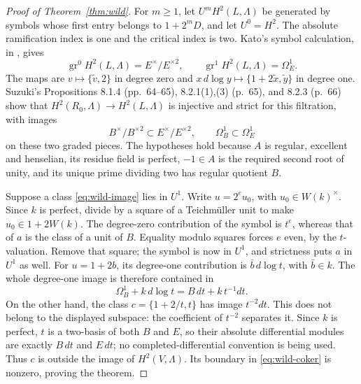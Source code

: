 \begin{proof}[Proof of Theorem~\ref{thm:wild}]
For $m\ge1$, let $U^mH^2(L,\Lambda)$ be generated by symbols
whose first entry belongs to $1+2^mD$, and let $U^0=H^2$.
The absolute ramification index is one and the critical index
is two. Kato's symbol calculation, in
\cite[Proposition 6.1.2(1),(3), p.~51]{Suzuki}, gives
\[
 \operatorname{gr}^0H^2(L,\Lambda)=E^\times/E^{\times2},
 \qquad \operatorname{gr}^1H^2(L,\Lambda)=\Omega_E^1.
\]
The maps are $v\mapsto\{\widetilde v,2\}$ in degree zero
and $x\,d\log y\mapsto\{1+2\widetilde x,\widetilde y\}$
in degree one. Suzuki's
Propositions 8.1.4 (pp.~64--65), 8.2.1(1),(3) (p.~65),
and 8.2.3 (p.~66) show that
$H^2(R_0,\Lambda)\to H^2(L,\Lambda)$ is injective and strict
for this filtration, with images
\[
 B^\times/B^{\times2}\subset E^\times/E^{\times2},
 \qquad \Omega_B^1\subset\Omega_E^1
\]
on these two graded pieces. The hypotheses hold because $A$
is regular, excellent and henselian, its residue field is perfect,
$-1\in A$ is the required second root of unity, and its unique
prime dividing two has regular quotient $B$.

Suppose a class \eqref{eq:wild-image} lies in $U^1$. Write
$u=2^eu_0$, with $u_0\in W(k)^\times$. Since $k$ is perfect,
divide by a square of a Teichm\"uller unit to make $u_0\in1+2W(k)$.
The degree-zero contribution of the symbol is $t^e$, whereas
that of $a$ is the class of a unit of $B$. Equality modulo
squares forces $e$ even, by the $t$-valuation. Remove that
square; the symbol is now in $U^1$, and strictness puts $a$
in $U^1$ as well. For $u=1+2b$, its degree-one contribution
is $\bar b\,d\log t$, with $\bar b\in k$. The whole degree-one
image is therefore contained in
\[
 \Omega_B^1+k\,d\log t=B\,dt+k\,t^{-1}dt.
\]
On the other hand, the class $c=\{1+2/t,t\}$ has image
$t^{-2}dt$. This does not belong to the displayed subspace:
the coefficient of $t^{-2}$ separates it. Since $k$ is perfect,
$t$ is a two-basis of both $B$ and $E$, so their absolute
differential modules are exactly $B\,dt$ and $E\,dt$; no
completed-differential convention is being used. Thus $c$ is
outside the image of $H^2(V,\Lambda)$. Its boundary in
\eqref{eq:wild-coker} is nonzero, proving the theorem.
\end{proof}
